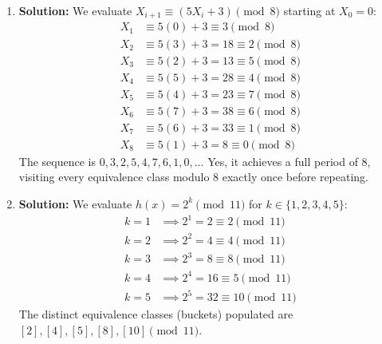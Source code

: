 \documentclass[11pt, a4paper]{article}
\theoremstyle{definition}
\theoremstyle{remark}
\begin{document}
\begin{enumerate}[label=\textbf{\arabic*.}]
    \item \textbf{Solution:}
    We evaluate $X_{i+1} \equiv (5X_i + 3) \pmod{8}$ starting at $X_0 = 0$:
    \begin{align*}
        X_1 &\equiv 5(0) + 3 \equiv 3 \pmod{8} \\
        X_2 &\equiv 5(3) + 3 = 18 \equiv 2 \pmod{8} \\
        X_3 &\equiv 5(2) + 3 = 13 \equiv 5 \pmod{8} \\
        X_4 &\equiv 5(5) + 3 = 28 \equiv 4 \pmod{8} \\
        X_5 &\equiv 5(4) + 3 = 23 \equiv 7 \pmod{8} \\
        X_6 &\equiv 5(7) + 3 = 38 \equiv 6 \pmod{8} \\
        X_7 &\equiv 5(6) + 3 = 33 \equiv 1 \pmod{8} \\
        X_8 &\equiv 5(1) + 3 = 8 \equiv 0 \pmod{8}
    \end{align*}
    The sequence is $0, 3, 2, 5, 4, 7, 6, 1, 0, \dots$ Yes, it achieves a full period of 8, visiting every equivalence class modulo 8 exactly once before repeating.

    \begin{center}
    \end{center}

    \item \textbf{Solution:}
    We evaluate $h(x) = 2^k \pmod{11}$ for $k \in \{1, 2, 3, 4, 5\}$:
    \begin{align*}
        k=1 &\implies 2^1 = 2 \equiv 2 \pmod{11} \\
        k=2 &\implies 2^2 = 4 \equiv 4 \pmod{11} \\
        k=3 &\implies 2^3 = 8 \equiv 8 \pmod{11} \\
        k=4 &\implies 2^4 = 16 \equiv 5 \pmod{11} \\
        k=5 &\implies 2^5 = 32 \equiv 10 \pmod{11}
    \end{align*}
    The distinct equivalence classes (buckets) populated are $[2], [4], [5], [8], [10] \pmod{11}$.


\end{enumerate}
\end{document}

